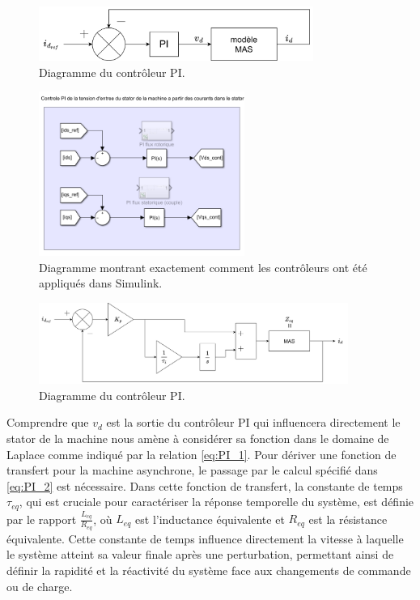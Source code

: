 \begin{figure}[!h]
    \centering
    \includegraphics[width=0.8\textwidth]{diagrammes/PI_a.png} 
    \caption{Diagramme du contrôleur PI.}
    \label{img-PI_a}
\end{figure}

\begin{figure}[!h]
    \centering
    \includegraphics[width=0.6\textwidth]{imgsMATLAB/MAS/CI/CI_controlePI.png} 
    \caption{Diagramme montrant exactement comment les contrôleurs ont été appliqués dans Simulink.}
    \label{img-CI_controlePI}
\end{figure}

\begin{figure}[!h]
    \centering
    \includegraphics[width=0.9\textwidth]{diagrammes/PI.png} 
    \caption{Diagramme du contrôleur PI.}
    \label{img-PI}
\end{figure}

Comprendre que \( v_d \) est la sortie du contrôleur PI qui influencera directement le stator de la machine nous amène à considérer sa fonction dans le domaine de Laplace comme indiqué par la relation \ref{eq:PI_1}. Pour dériver une fonction de transfert pour la machine asynchrone, le passage par le calcul spécifié dans \ref{eq:PI_2} est nécessaire. Dans cette fonction de transfert, la constante de temps \( \tau_{eq} \), qui est cruciale pour caractériser la réponse temporelle du système, est définie par le rapport \( \frac{L_{eq}}{R_{eq}} \), où \( L_{eq} \) est l'inductance équivalente et \( R_{eq} \) est la résistance équivalente. Cette constante de temps influence directement la vitesse à laquelle le système atteint sa valeur finale après une perturbation, permettant ainsi de définir la rapidité et la réactivité du système face aux changements de commande ou de charge.

